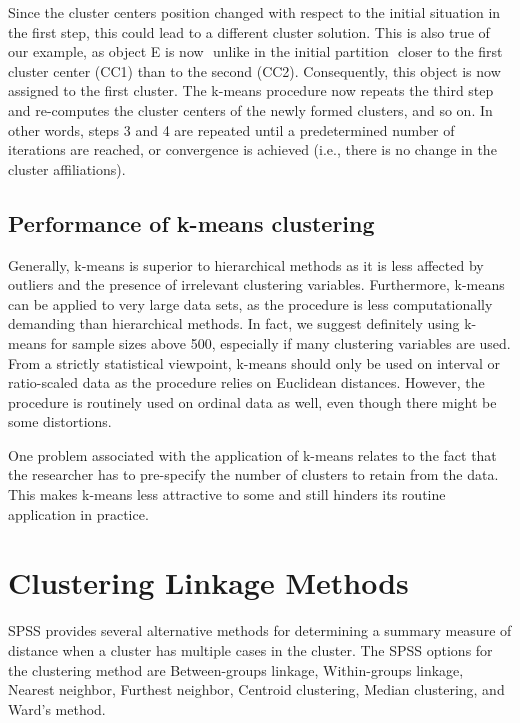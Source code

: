 \documentclass[a4paper,12pt]{article}
\begin{document}
Since the cluster centers position changed with respect to the initial situation in the first step,
this could lead to a different cluster solution. This is also true of our example, as
object E is now  unlike in the initial partition  closer to the first cluster center
(CC1) than to the second (CC2). Consequently, this object is now assigned to the
first cluster.
The k-means procedure now repeats the third step and
re-computes the cluster centers of the newly formed clusters, and so on.
In other words, steps 3 and 4 are repeated until a predetermined number of iterations are
reached, or convergence is achieved (i.e., there is no change in the cluster affiliations).

\subsection{Performance of k-means clustering}
Generally, k-means is superior to hierarchical methods as it is less affected by
outliers and the presence of irrelevant clustering variables. Furthermore, k-means
can be applied to very large data sets, as the procedure is less computationally
demanding than hierarchical methods. In fact, we suggest definitely using k-means
for sample sizes above 500, especially if many clustering variables are used. From
a strictly statistical viewpoint, k-means should only be used on interval or ratio-scaled
data as the procedure relies on Euclidean distances. However, the procedure is
routinely used on ordinal data as well, even though there might be some distortions.

One problem associated with the application of k-means relates to the fact that
the researcher has to pre-specify the number of clusters to retain from the data. This
makes k-means less attractive to some and still hinders its routine application in
practice.

\section{Clustering Linkage Methods}

SPSS provides several alternative methods for determining a summary measure of distance when a cluster has multiple cases in the cluster.  The SPSS options for the clustering method are Between-groups linkage, Within-groups linkage, Nearest neighbor, Furthest neighbor, Centroid clustering, Median clustering, and Ward's method.
\end{document}
